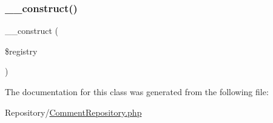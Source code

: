 \subsubsection{\texorpdfstring{\_\_construct()}{\_\_construct()}}
{\footnotesize\ttfamily \+\_\+\+\_\+construct (\begin{DoxyParamCaption}\item[{Registry\+Interface}]{\$registry }\end{DoxyParamCaption})}



The documentation for this class was generated from the following file\+:\begin{DoxyCompactItemize}
\item 
Repository/\mbox{\hyperlink{_comment_repository_8php}{Comment\+Repository.\+php}}\end{DoxyCompactItemize}
